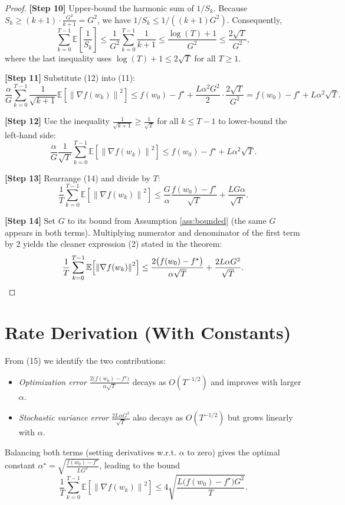 \documentclass[11pt]{article}
\newcommand{\EE}{\mathbb{E}}
\newcommand{\norm}[1]{\left\|#1\right\|}
\begin{document}
\begin{proof}
\textbf{[Step 10]} Upper‑bound the harmonic sum of $1/S_k$. Because $S_k\ge (k+1) \cdot \frac{G^2}{k+1}=G^2$, we have $1/S_k\le 1/((k+1)G^2)$. Consequently,
\[
\sum_{k=0}^{T-1}\EE\!\left[\frac{1}{S_k}\right]
\le \frac{1}{G^2}\sum_{k=0}^{T-1}\frac{1}{k+1}
\le \frac{\log(T)+1}{G^2}
\le \frac{2\sqrt{T}}{G^2},
\tag{12}
\]
where the last inequality uses $\log(T)+1\le 2\sqrt{T}$ for all $T\ge 1$.

\textbf{[Step 11]} Substitute (12) into (11):
\[
\frac{\alpha}{G}\sum_{k=0}^{T-1}\frac{1}{\sqrt{k+1}}\EE\!\left[\norm{\nabla f(w_k)}^2\right]
\le f(w_0)-f^\star
+ \frac{L\alpha^2 G^2}{2}\cdot\frac{2\sqrt{T}}{G^2}
= f(w_0)-f^\star + L\alpha^2\sqrt{T}.
\tag{13}
\]

\textbf{[Step 12]} Use the inequality $\frac{1}{\sqrt{k+1}}\ge \frac{1}{\sqrt{T}}$ for all $k\le T-1$ to lower‑bound the left‑hand side:
\[
\frac{\alpha}{G}\frac{1}{\sqrt{T}}\sum_{k=0}^{T-1}\EE\!\left[\norm{\nabla f(w_k)}^2\right]
\le f(w_0)-f^\star + L\alpha^2\sqrt{T}.
\tag{14}
\]

\textbf{[Step 13]} Rearrange (14) and divide by $T$:
\[
\frac{1}{T}\sum_{k=0}^{T-1}\EE\!\left[\norm{\nabla f(w_k)}^2\right]
\le \frac{G}{\alpha}\frac{f(w_0)-f^\star}{\sqrt{T}}
+ \frac{LG\alpha}{\sqrt{T}} .
\tag{15}
\]

\textbf{[Step 14]} Set $G$ to its bound from Assumption \ref{ass:bounded} (the same $G$ appears in both terms). Multiplying numerator and denominator of the first term by $2$ yields the cleaner expression (2) stated in the theorem:
\[
\frac{1}{T}\sum_{k=0}^{T-1}\EE\!\left[\norm{\nabla f(w_k)}^2\right]
\le \frac{2\bigl(f(w_0)-f^\star\bigr)}{\alpha\sqrt{T}}
+ \frac{2L\alpha G^2}{\sqrt{T}} .
\qedhere
\]
\end{proof}

\section*{Rate Derivation (With Constants)}
From (15) we identify the two contributions:
\begin{itemize}
\item \emph{Optimization error} $\displaystyle \frac{2\bigl(f(w_0)-f^\star\bigr)}{\alpha\sqrt{T}}$ decays as $O(T^{-1/2})$ and improves with larger $\alpha$.
\item \emph{Stochastic variance error} $\displaystyle \frac{2L\alpha G^2}{\sqrt{T}}$ also decays as $O(T^{-1/2})$ but grows linearly with $\alpha$.
\end{itemize}
Balancing both terms (setting derivatives w.r.t. $\alpha$ to zero) gives the optimal constant $\alpha^\star=\sqrt{\frac{f(w_0)-f^\star}{LG^2}}$, leading to the bound
\[
\frac{1}{T}\sum_{k=0}^{T-1}\EE\!\left[\norm{\nabla f(w_k)}^2\right]
\le 4\sqrt{\frac{L\bigl(f(w_0)-f^\star\bigr)G^2}{T}} .
\]
\end{document}

